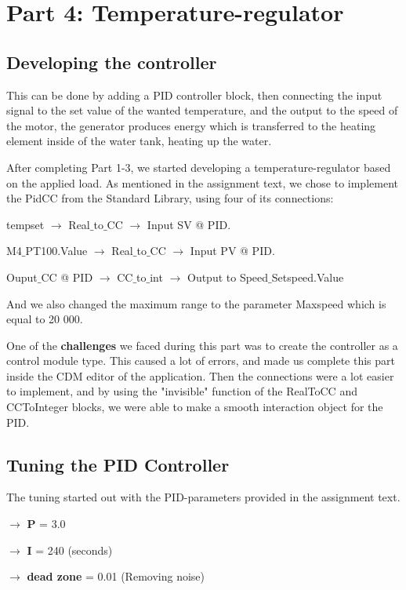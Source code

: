 \newpage
\section{Part 4: Temperature-regulator}

\subsection{Developing the controller}

This can be done by adding a PID controller block, then connecting the input signal to the set value of the wanted temperature, and the output to the speed of the motor, the generator produces energy which is transferred to the heating element inside of the water tank, heating up the water.

After completing Part 1-3, we started developing a temperature-regulator based on the applied load. As mentioned in the assignment text, we chose to implement the PidCC from the Standard Library, using four of its connections: 

tempset $\rightarrow$ Real$\_$to$\_$CC $\rightarrow$ Input SV @ PID.

M4$\_$PT100.Value $\rightarrow$ Real$\_$to$\_$CC $\rightarrow$ Input PV @ PID.

Ouput$\_$CC @ PID $\rightarrow$ CC$\_$to$\_$int $\rightarrow$ Output to Speed$\_$Setspeed.Value

And we also changed the maximum range to the parameter Maxspeed which is equal to 20 000.

One of the \textbf{challenges} we faced during this part was to create the controller as a control module type. This caused a lot of errors, and made us complete this part inside the CDM editor of the application. Then the connections were a lot easier to implement, and by using the "invisible" function of the RealToCC and CCToInteger blocks, we were able to make a smooth interaction object for the PID.

\subsection{Tuning the PID Controller}

The tuning started out with the PID-parameters provided in the assignment text.

$\rightarrow$ \textbf{P} = 3.0

$\rightarrow$ \textbf{I} = 240 (seconds)

$\rightarrow$ \textbf{dead zone} = 0.01 (Removing noise)

